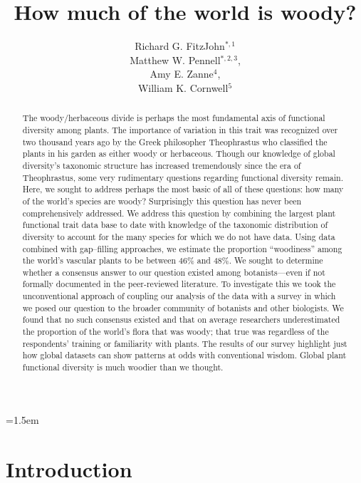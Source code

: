 \documentclass[12pt]{article}
\title{How much of the world is woody?}
\author{
Richard G. FitzJohn$^{*,1}$\\ Matthew W. Pennell$^{*,2,3}$,\\ Amy E. Zanne$^{4}$,\\ William K. Cornwell$^{5}$
}
\date{}
\affiliation{\noindent
$^*$ These authors contributed equally}
\begin{document}
\mstitlepage
\parindent=1.5em
\addtolength{\parskip}{.3em}

\begin{abstract}
The woody/herbaceous divide is perhaps the most fundamental axis of functional diversity among plants. The importance of variation in this trait was recognized over two thousand years ago by the Greek philosopher Theophrastus who classified the plants in his garden as either woody or herbaceous. Though our knowledge of global diversity's taxonomic structure  has increased tremendously since the era of Theophrastus, some very rudimentary questions regarding functional diversity remain. Here, we sought to address perhaps the most basic of all of these questions: how many of the world's species are woody? Surprisingly this question has never been comprehensively addressed.  We address this question by combining the largest plant functional trait data base to date with knowledge of the taxonomic distribution of diversity to account for the many species for which we do not have data. Using data combined with gap--filling approaches, we estimate the proportion ``woodiness'' among the world's vascular plants to be between 46\% and 48\%.  We sought to determine whether a consensus answer to our question existed among botanists---even if not formally documented in the peer-reviewed literature. To investigate this we took the unconventional approach of coupling our analysis of the data with a survey in which we posed our question to the broader community of botanists and other biologists.  We found that no such consensus existed and that on average researchers underestimated the proportion of the world's flora that was woody; that true was regardless of the respondents' training or familiarity with plants. The results of our survey highlight just how global datasets can show patterns at odds with conventional wisdom.  Global plant functional diversity is much woodier than we thought.  
\end{abstract}

\section{Introduction}
\end{document}
